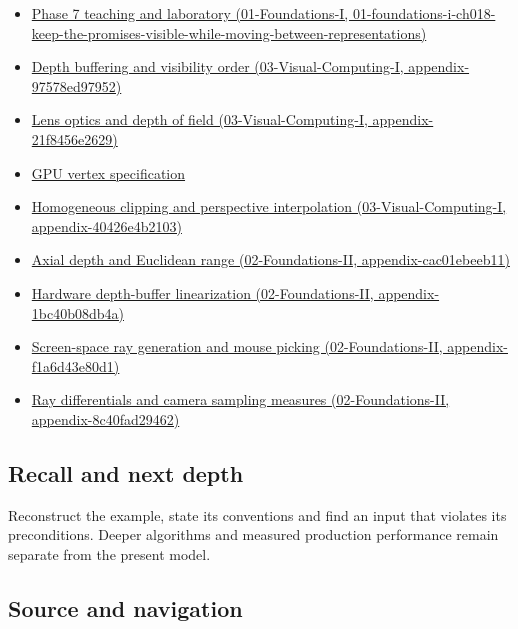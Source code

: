 \begin{itemize}
\item
  \href{../01-Foundations-I/main.pdf\#nameddest=01-foundations-i-ch018-keep-the-promises-visible-while-moving-between-representations}{Phase 7 teaching and laboratory (01-Foundations-I, 01-foundations-i-ch018-keep-the-promises-visible-while-moving-between-representations)}
\item
  \href{../03-Visual-Computing-I/main.pdf\#nameddest=appendix-97578ed97952}{Depth buffering and visibility order (03-Visual-Computing-I, appendix-97578ed97952)}
\item
  \href{../03-Visual-Computing-I/main.pdf\#nameddest=appendix-21f8456e2629}{Lens optics and depth of field (03-Visual-Computing-I, appendix-21f8456e2629)}
\item
  \hyperref[appendix-749ba51a6c25]{GPU vertex specification}
\item
  \href{../03-Visual-Computing-I/main.pdf\#nameddest=appendix-40426e4b2103}{Homogeneous clipping and perspective interpolation (03-Visual-Computing-I, appendix-40426e4b2103)}
\item
  \href{../02-Foundations-II/main.pdf\#nameddest=appendix-cac01ebeeb11}{Axial depth and Euclidean range (02-Foundations-II, appendix-cac01ebeeb11)}
\item
  \href{../02-Foundations-II/main.pdf\#nameddest=appendix-1bc40b08db4a}{Hardware depth-buffer linearization (02-Foundations-II, appendix-1bc40b08db4a)}
\item
  \href{../02-Foundations-II/main.pdf\#nameddest=appendix-f1a6d43e80d1}{Screen-space ray generation and mouse picking (02-Foundations-II, appendix-f1a6d43e80d1)}
\item
  \href{../02-Foundations-II/main.pdf\#nameddest=appendix-8c40fad29462}{Ray differentials and camera sampling measures (02-Foundations-II, appendix-8c40fad29462)}
\end{itemize}

\subsection{Recall and next depth}\label{appendix-1c07d64f5e70-recall-and-next-depth}

Reconstruct the example, state its conventions and find an input that violates its preconditions. Deeper algorithms and measured production performance remain separate from the present model.

\subsection{Source and navigation}\label{appendix-1c07d64f5e70-source-and-navigation}

